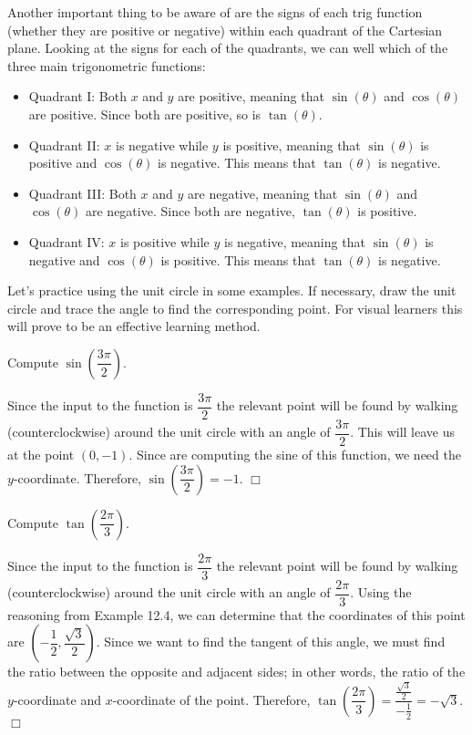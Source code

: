 \documentclass[../book.tex]{subfiles}
\begin{document}
Another important thing to be aware of are the signs of each trig function (whether they are positive or negative) within each quadrant of the Cartesian plane.  Looking at the signs for each of the quadrants, we can well which of the three main trigonometric functions:\begin{itemize}
    \item Quadrant I: Both $x$ and $y$ are positive, meaning that $\sin(\theta)$ and $\cos(\theta)$ are positive.  Since both are positive, so is $\tan(\theta)$.
    \item Quadrant II: $x$ is negative while $y$ is positive, meaning that $\sin(\theta)$ is positive and $\cos(\theta)$ is negative.  This means that $\tan(\theta)$ is negative.
    \item Quadrant III: Both $x$ and $y$ are negative, meaning that $\sin(\theta)$ and $\cos(\theta)$ are negative.  Since both are negative, $\tan(\theta)$ is positive.
    \item Quadrant IV: $x$ is positive while $y$ is negative, meaning that $\sin(\theta)$ is negative and $\cos(\theta)$ is positive.  This means that $\tan(\theta)$ is negative.
\end{itemize}
Let's practice using the unit circle in some examples.  If necessary, draw the unit circle and trace the angle to find the corresponding point.  For visual learners this will prove to be an effective learning method.
\begin{example}
Compute $\sin\left(\dfrac{3\pi}{2}\right)$.
\end{example}
\begin{solution}
Since the input to the function is $\dfrac{3\pi}{2}$ the relevant point will be found by walking (counterclockwise) around the unit circle with an angle of $\dfrac{3\pi}{2}$. This will leave us at the point $(0,-1)$. Since are computing the sine of this function, we need the $y$-coordinate. Therefore, $\sin\left(\dfrac{3\pi}{2}\right)=-1$. $\Box$
\end{solution}
\begin{example}
Compute $\tan\left(\dfrac{2\pi}{3}\right)$.
\end{example}
\begin{solution}
Since the input to the function is $\dfrac{2\pi}{3}$ the relevant point will be found by walking (counterclockwise) around the unit circle with an angle of $\dfrac{2\pi}{3}$. Using the reasoning from Example 12.4, we can determine that the coordinates of this point are $\left(-\dfrac{1}{2},\dfrac{\sqrt{3}}{2}\right)$. Since we want to find the tangent of this angle, we must find the ratio between the opposite and adjacent sides; in other words, the ratio of the $y$-coordinate and $x$-coordinate of the point. Therefore, $\tan\left(\dfrac{2\pi}{3}\right)=\dfrac{\frac{\sqrt{3}}{2}}{-\frac{1}{2}}=-\sqrt{3}.$ $\Box$
\end{solution}
\end{document}
